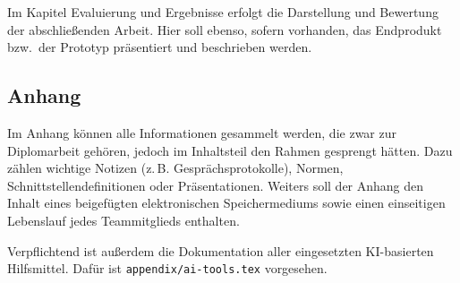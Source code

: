 Im Kapitel Evaluierung und Ergebnisse erfolgt die Darstellung und Bewertung
der abschließenden Arbeit. Hier soll ebenso, sofern vorhanden, das
Endprodukt bzw.\ der Prototyp präsentiert und beschrieben werden.

\subsection{Anhang}

Im Anhang können alle Informationen gesammelt werden, die zwar zur
Diplomarbeit gehören, jedoch im Inhaltsteil den Rahmen gesprengt hätten.
Dazu zählen wichtige Notizen (z.\,B. Gesprächsprotokolle), Normen,
Schnittstellendefinitionen oder Präsentationen. Weiters soll der Anhang den
Inhalt eines beigefügten elektronischen Speichermediums sowie einen
einseitigen Lebenslauf jedes Teammitglieds enthalten.

Verpflichtend ist außerdem die Dokumentation aller eingesetzten KI-basierten
Hilfsmittel. Dafür ist \lstinline|appendix/ai-tools.tex| vorgesehen.
